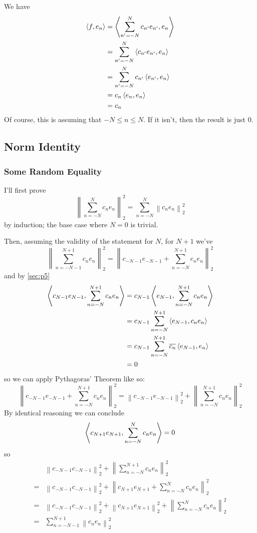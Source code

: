 \documentclass[12pt]{article}
\newcommand{\norm}[1]{\left\lVert#1\right\rVert}
\begin{document}
We have
\begin{align*}
  \Braket{f, e_n}
   & = \Braket{\sum_{n'=-N}^{N} c_{n'}e_{n'}, e_n} \\
   & = \sum_{n'=-N}^{N} \Braket{c_{n'}e_{n'}, e_n}  \\
   & = \sum_{n'=-N}^{N} c_{n'}\Braket{e_{n'}, e_n}  \\
   & = c_n\Braket{e_n, e_n}                    \\
   & = c_n
\end{align*}
Of course, this is assuming that $-N \le n \le N$.
If it isn't, then the result is just $0$.

\pagebreak

\subsection{Norm Identity}

\subsubsection{Some Random Equality}

I'll first prove
\[\norm{\sum_{n=-N}^{N} c_ne_n}_2^2 = \sum_{n=-N}^{N} \norm{c_ne_n}_2^2\]
by induction; the base case where $N=0$ is trivial.

Then, assuming the validity of the statement for $N$, for $N+1$ we've
\[\norm{\sum_{n=-N-1}^{N+1} c_ne_n}_2^2
  = \norm{c_{-N-1}e_{-N-1}+\sum_{n=-N}^{N+1} c_ne_n}_2^2\]
and by \ref{sec:p5}
\begin{align*}
  \Braket{c_{N-1}e_{N-1}, \sum_{n=-N}^{N+1} c_ne_n}
   & = c_{N-1}\Braket{e_{N-1}, \sum_{n=-N}^{N+1} c_ne_n}            \\
   & = c_{N-1}\sum_{n=-N}^{N+1} \Braket{e_{N-1}, c_ne_n}            \\
   & = c_{N-1}\sum_{n=-N}^{N+1} \overline{c_n}\Braket{e_{N-1}, e_n} \\
   & = 0
\end{align*}
so we can apply Pythagoras' Theorem like so:
\[\norm{c_{-N-1}e_{-N-1}+\sum_{n=-N}^{N+1} c_ne_n}_2^2
  =\norm{c_{-N-1}e_{-N-1}}_2^2+\norm{\sum_{n=-N}^{N+1} c_ne_n}_2^2\]
By identical reasoning we can conclude
\[\Braket{c_{N+1}e_{N+1}, \sum_{n=-N}^{N} c_ne_n}=0\]
so
\begin{align*}
      & \norm{c_{-N-1}c_{-N-1}}_2^2+\norm{\sum_{n=-N}^{N+1} c_ne_n}_2^2                         \\
  ={} & \norm{c_{-N-1}c_{-N-1}}_2^2+\norm{c_{N+1}e_{N+1} + \sum_{n=-N}^{N} c_ne_n}_2^2          \\
  ={} & \norm{c_{-N-1}c_{-N-1}}_2^2+\norm{c_{N+1}e_{N+1}}_2^2+\norm{\sum_{n=-N}^{N} c_ne_n}_2^2 \\
  ={} & \sum_{n=-N-1}^{N+1} \norm{c_ne_n}_2^2
\end{align*}
\end{document}
